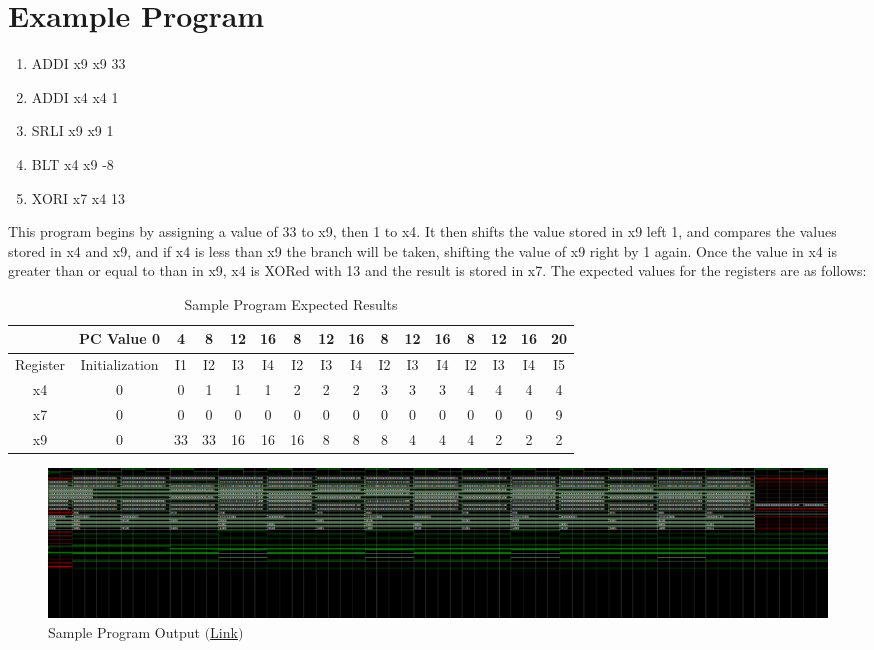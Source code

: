 \documentclass[10pt,letterpaper]{article}
\begin{document}
\section{Example Program}
\begin{enumerate}
	\item ADDI x9 x9 33
	\item ADDI x4 x4 1
	\item SRLI x9 x9 1
	\item BLT x4 x9 -8
	\item XORI x7 x4 13 	
\end{enumerate}
This program begins by assigning a value of 33 to x9, then 1 to x4. It then shifts the value stored in x9 left 1, and compares the values stored in x4 and x9, and if x4 is less than x9 the branch will be taken, shifting the value of x9 right by 1 again. Once the value in x4 is greater than or equal to than in x9, x4 is XORed with 13 and the result is stored in x7.
The expected values for the registers are as follows:
\begin{table}[H]
	\centering
	\begin{tabular}{|c|c|c|c|c|c|c|c|c|c|c|c|c|c|c|c|}
		\hline
		\multicolumn{1}{|l|}{} & PC Value 0     & 4  & 8  & 12 & 16 & 8  & 12 & 16 & 8  & 12 & 16 & 8  & 12 & 16 & 20 \\ \hline
		Register               & Initialization & I1 & I2 & I3 & I4 & I2 & I3 & I4 & I2 & I3 & I4 & I2 & I3 & I4 & I5 \\ \hline
		x4                     & 0              & 0  & 1  & 1  & 1  & 2  & 2  & 2  & 3  & 3  & 3  & 4  & 4  & 4  & 4  \\ \hline
		x7                     & 0              & 0  & 0  & 0  & 0  & 0  & 0  & 0  & 0  & 0  & 0  & 0  & 0  & 0  & 9  \\ \hline
		x9                     & 0              & 33 & 33 & 16 & 16 & 16 & 8  & 8  & 8  & 4  & 4  & 4  & 2  & 2  & 2  \\ \hline
	\end{tabular}
	\caption{Sample Program Expected Results}
\end{table}
\begin{figure}[H]
	\centering
	\includegraphics[width=\linewidth]{Figures/SampleProgram}
	\caption{Sample Program Output \href{https://drive.google.com/file/d/1mjlTnk4JS1E0iR5rboaUu_RLDmP1-2R1/view?usp=sharing}{$($Link$)$}}
	\label{fig:sampleprogram}
\end{figure}
\end{document}
